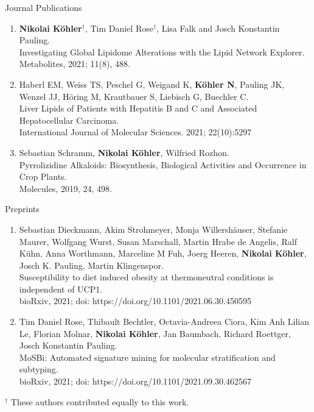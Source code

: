
\datedsubsection{}
{%
}
{%
	Journal Publications
}
{%
	\begin{enumerate}
		\item \textbf{Nikolai K\"ohler}$^{\dagger}$, Tim Daniel Rose$^{\dagger}$, Lisa Falk and Josch Konstantin Pauling.\\
			Investigating Global Lipidome Alterations with the Lipid Network Explorer.\\
			Metabolites, 2021; 11(8), 488.
		\item Haberl EM, Weiss TS, Peschel G, Weigand K, \textbf{K\"ohler N}, Pauling JK, Wenzel JJ, Höring M, Krautbauer S, Liebisch G, Buechler C.\\
			Liver Lipids of Patients with Hepatitis B and C and Associated Hepatocellular Carcinoma.\\
			International Journal of Molecular Sciences. 2021; 22(10):5297
		\item Sebastian Schramm, \textbf{Nikolai K\"ohler}, Wilfried Rozhon.\\
			Pyrrolizidine Alkaloids: Biosynthesis, Biological Activities and Occurrence in Crop Plants.\\
			Molecules, 2019, 24, 498.
		\setcounter{publicationCounter}{\value{enumi}}	%
	\end{enumerate}
}

\datedsubsection{}
{%
}
{%
	Preprints
}
{%
	\begin{enumerate}
		\item Sebastian Dieckmann, Akim Strohmeyer, Monja Willershäuser, Stefanie Maurer, Wolfgang Wurst, Susan Marschall, Martin Hrabe de Angelis, Ralf Kühn, Anna Worthmann, Marceline M Fuh, Joerg Heeren, \textbf{Nikolai K\"ohler}, Josch K. Pauling, Martin Klingenspor.\\
			Susceptibility to diet induced obesity at thermoneutral conditions is independent of UCP1.\\
			bioRxiv, 2021; doi: https://doi.org/10.1101/2021.06.30.450595
		\item Tim Daniel Rose, Thibault Bechtler, Octavia-Andreea Ciora, Kim Anh Lilian Le, Florian Molnar, \textbf{Nikolai K\"ohler}, Jan Baumbach, Richard Roettger, Josch Konstantin Pauling.\\
			MoSBi: Automated signature mining for molecular stratification and subtyping.\\
			bioRxiv, 2021; doi: https://doi.org/10.1101/2021.09.30.462567
		\setcounter{publicationCounter}{\value{enumi}}
	\end{enumerate}
}
\bigskip
{\footnotesize $^{\dagger}$ These authors contributed equally to this work.}

